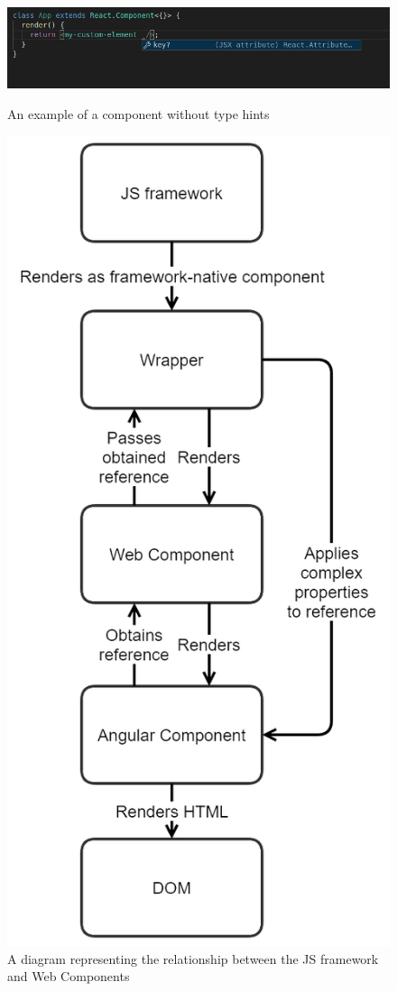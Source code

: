 \begin{figure}[htbp]
  \caption{An example of a component without type hints}
  \includegraphics[width=\columnwidth]{figures/background/no-hinting.png}
  \label{fig:bg:no-hinting}
  \centering
\end{figure}

\begin{figure}[htbp]
  \caption{A diagram representing the relationship between the JS framework and Web Components}
  \includegraphics[scale=0.3]{figures/background/wrapper-diagram.png}

\end{figure}
